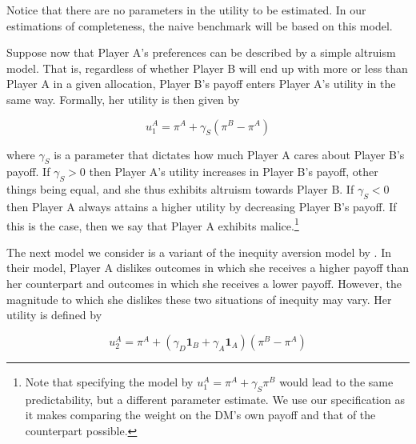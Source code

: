 \documentclass[11pt,a4paper]{article}
\theoremstyle{definition}
\begin{document}
Notice that there are no parameters in the utility to be estimated. In our estimations of completeness, the naive benchmark will be based on this model.

Suppose now that Player A's preferences can be described by a simple altruism model. That is, regardless of whether Player B will end up with more or less than Player A in a given allocation, Player B's payoff enters Player A's utility in the same way. Formally, her utility is then given by

\begin{equation}
\label{eq:simple_altruism}
u^{A}_1=\pi^{A}+\gamma_S(\pi^{B}-\pi^A)
\end{equation}

where \(\gamma_S\) is a parameter that dictates how much Player A cares about Player B's payoff. If \(\gamma_S>0\) then Player A's utility increases in Player B's payoff, other things being equal, and she thus exhibits altruism towards Player B. If \(\gamma_S<0\) then Player A always attains a higher utility by decreasing Player B's payoff. If this is the case, then we say that Player A exhibits malice.\footnote{Note that specifying the model by \(u^{A}_1=\pi^{A}+\gamma_S \pi^{B}\) would lead to the same predictability, but a different parameter estimate. We use our specification as it makes comparing the weight on the DM's own payoff and that of the counterpart possible.}

The next model we consider is a variant of the inequity aversion model by \citet{Fehr1999}. In their model, Player A dislikes outcomes in which she receives a higher payoff than her counterpart and outcomes in which she receives a lower payoff. However, the magnitude to which she dislikes these two situations of inequity may vary. Her utility is defined by

\begin{equation}
\label{eq:inequity_aversion}
u^{A}_2=\pi^A + (\gamma_D \mathbf{1}_B + \gamma_A \mathbf{1}_A)(\pi^B-\pi^A)
\end{equation}
\end{document}
